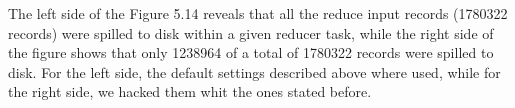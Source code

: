 \begin{itemize}
The left side of the Figure 5.14 reveals that all the reduce input records (1780322 records) were spilled to disk within a given reducer task, while the right side of the figure shows that only 1238964 of a total of 1780322 records were spilled to disk. For the left side, the default settings described above where used, while for the right side, we hacked them whit the ones stated before.


\end{itemize}























